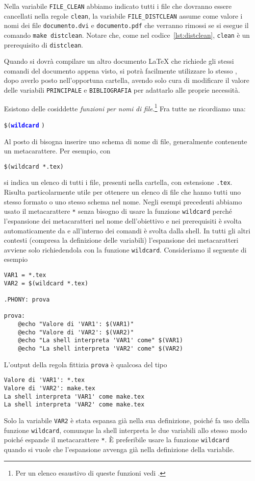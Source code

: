 Nella variabile \texttt{FILE\_CLEAN} abbiamo indicato tutti i file che dovranno
essere cancellati nella regole \texttt{clean}, la variabile
\texttt{FILE\_DISTCLEAN} assume come valore i nomi dei file
\texttt{documento.dvi} e \texttt{documento.pdf} che verranno rimossi se si
esegue il comando \texttt{make distclean}.  Notare che, come nel
codice~\ref{lst:distclean}, \texttt{clean} è un prerequisito di
\texttt{distclean}.

Quando si dovrà compilare un altro documento \LaTeX{}
che richiede gli stessi comandi del documento appena visto, si potrà facilmente
utilizzare lo stesso , dopo averlo posto nell'opportuna
cartella, avendo solo cura di modificare il valore delle variabili
\texttt{PRINCIPALE} e \texttt{BIBLIOGRAFIA} per adattarlo alle proprie
necessità.

Esistono delle cosiddette \emph{funzioni per nomi di
  file}.\footnote{Per
  un elenco esaustivo di queste funzioni vedi \cite[pagina 83]{gnu:make}.}
Fra tutte ne ricordiamo una:
\begin{sintassi}
  \small \texttt{\$(\textcolor{blue}{\textbf{wildcard}}}
  \texttt{)}
\end{sintassi}
Al posto di  bisogna inserire uno schema di nome di file,
generalmente contenente un metacarattere. Per esempio, con
\begin{lstlisting}
$(wildcard *.tex)
\end{lstlisting} %
si indica un elenco di tutti i file, presenti nella cartella, con estensione
\texttt{.tex}.  Risulta particolarmente utile per ottenere un elenco di file che
hanno tutti uno stesso formato o uno stesso schema nel nome.  Negli esempi
precedenti abbiamo usato il metacarattere \texttt{*} senza bisogno di usare la
funzione \texttt{wildcard} perché l'espansione dei metacaratteri nel nome
dell'obiettivo e nei prerequisiti è svolta automaticamente da  e
all'interno dei comandi è svolta dalla shell.  In tutti gli altri contesti
(compresa la definizione delle variabili) l'espansione dei metacaratteri avviene
solo richiedendola con la funzione \texttt{wildcard}.  Consideriamo il seguente
 di esempio
\begin{lstlisting}
VAR1 = *.tex
VAR2 = $(wildcard *.tex)

.PHONY: prova

prova:
	@echo "Valore di 'VAR1': $(VAR1)"
	@echo "Valore di 'VAR2': $(VAR2)"
	@echo "La shell interpreta 'VAR1' come" $(VAR1)
	@echo "La shell interpreta 'VAR2' come" $(VAR2)
\end{lstlisting}
L'output della regola fittizia \texttt{prova} è qualcosa del tipo
\begin{verbatim}
Valore di 'VAR1': *.tex
Valore di 'VAR2': make.tex
La shell interpreta 'VAR1' come make.tex
La shell interpreta 'VAR2' come make.tex
\end{verbatim}
Solo la variabile \texttt{VAR2} è stata espansa già nella sua definizione,
poiché fa uso della funzione \texttt{wildcard}, comunque la shell interpreta le
due variabili allo stesso modo poiché espande il metacarattere \texttt{*}.  È
preferibile usare la funzione \texttt{wildcard} quando si vuole che l'espansione
avvenga già nella definizione della variabile.

